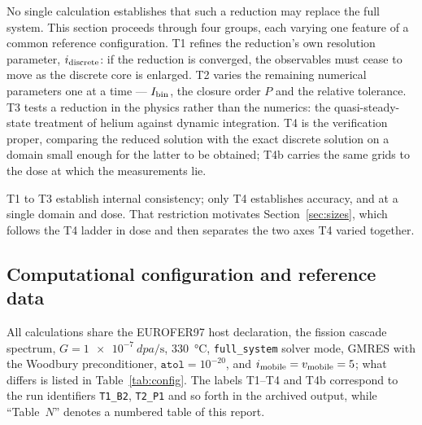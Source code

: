 \documentclass[11pt]{article}
\begin{document}
No single calculation establishes that such a reduction may replace the full
system. This section proceeds through four groups, each varying one feature of a
common reference configuration. T1 refines the reduction's own resolution
parameter, $i_{\rm discrete}$: if the reduction is converged, the observables
must cease to move as the discrete core is enlarged. T2 varies the remaining
numerical parameters one at a time --- $I_{\rm bin}$, the closure order $P$ and
the relative tolerance. T3 tests a reduction in the physics rather than the
numerics: the quasi-steady-state treatment of helium against dynamic
integration. T4 is the verification proper, comparing the reduced solution with
the exact discrete solution on a domain small enough for the latter to be
obtained; T4b carries the same grids to the dose at which the measurements lie.

T1 to T3 establish internal consistency; only T4 establishes accuracy, and at a
single domain and dose. That restriction motivates Section~\ref{sec:sizes},
which follows the T4 ladder in dose and then separates the two axes T4 varied
together.

\subsection{Computational configuration and reference data}

All calculations share the EUROFER97 host declaration, the fission cascade
spectrum, $G = \SI{1e-7}{dpa\per\second}$, \SI{330}{\celsius},
\texttt{full\_system} solver mode, GMRES with the Woodbury preconditioner,
$\texttt{atol} = 10^{-20}$, and $i_{\rm mobile} = v_{\rm mobile} = 5$; what
differs is listed in Table~\ref{tab:config}. The labels T1--T4 and T4b
correspond to the run identifiers \texttt{T1\_B2}, \texttt{T2\_P1} and so forth
in the archived output, while ``Table~$N$'' denotes a numbered table of this
report.
\end{document}
